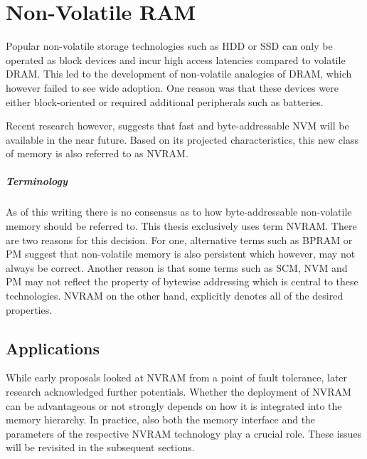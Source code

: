 \chapter{Non-Volatile RAM}
\label{ch:nvram}

Popular non-volatile storage technologies such as HDD or SSD can only be
operated as block devices and incur high access latencies compared to volatile
DRAM. This led to the development of non-volatile analogies of DRAM, which
however failed to see wide adoption. One reason was that these devices were
either block-oriented or required additional peripherals such as batteries.

Recent research however, suggests that fast and byte-addressable NVM will be
available in the near future. Based on its projected characteristics, this new
class of memory is also referred to as NVRAM.


\paragraph{Terminology}

As of this writing there is no consensus as to how byte-addressable non-volatile
memory should be referred to. This thesis exclusively uses term NVRAM. There are
two reasons for this decision. For one, alternative terms such as BPRAM or PM
suggest that non-volatile memory is also persistent which however, may not
always be correct. Another reason is that some terms such as SCM,
NVM and PM may not reflect the property of bytewise addressing which is central
to these technologies. NVRAM on the other hand, explicitly denotes all of the
desired properties.

\section{Applications}


While early proposals looked at NVRAM from a point of fault tolerance, later research acknowledged further potentials. Whether the deployment of NVRAM can be advantageous or not strongly depends on how it is integrated into the memory hierarchy. In practice, also both the memory interface and the parameters of the respective NVRAM technology play a crucial role. These issues will be revisited in the subsequent sections.

